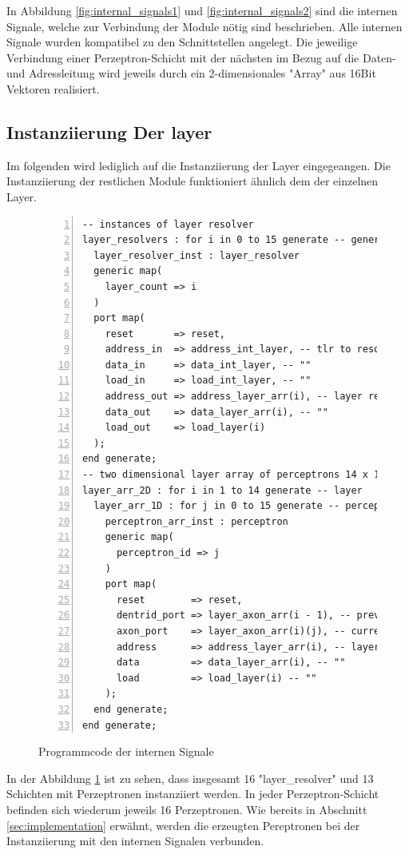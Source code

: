 \documentclass{article}
\numberwithin{equation}{section}
\begin{document}
\FloatBarrier
In Abbildung \ref{fig:internal_signals1} und \ref{fig:internal_signals2} sind die
internen Signale, welche zur Verbindung der Module nötig sind beschrieben.
Alle internen Signale wurden kompatibel zu den Schnittstellen angelegt.
Die jeweilige Verbindung einer Perzeptron-Schicht mit der nächsten im Bezug auf 
die Daten- und Adressleitung wird jeweils durch ein 2-dimensionales "Array" aus 
16Bit Vektoren realisiert.
\pagebreak
\subsection{Instanziierung Der layer}
Im folgenden wird lediglich auf die Instanziierung der Layer eingegeangen. 
Die Instanziierung der restlichen Module funktioniert ähnlich dem der einzelnen Layer.
\begin{figure}[htbp]
\begin{lstlisting}[style=VHDL,numbers=left,stepnumber=1,style=myCustomMatlabStyle,basicstyle=\footnotesize]
-- instances of layer resolver
layer_resolvers : for i in 0 to 15 generate -- generate 16 layer resolvers
  layer_resolver_inst : layer_resolver
  generic map(
    layer_count => i
  )
  port map(
    reset       => reset,
    address_in  => address_int_layer, -- tlr to resolvers
    data_in     => data_int_layer, -- ""
    load_in     => load_int_layer, -- ""
    address_out => address_layer_arr(i), -- layer resolver to perceptron array
    data_out    => data_layer_arr(i), -- ""
    load_out    => load_layer(i)
  );
end generate;
-- two dimensional layer array of perceptrons 14 x 16 (layer x perceptron)
layer_arr_2D : for i in 1 to 14 generate -- layer
  layer_arr_1D : for j in 0 to 15 generate -- perceptron in layer
    perceptron_arr_inst : perceptron
    generic map(
      perceptron_id => j
    )
    port map(
      reset        => reset,
      dentrid_port => layer_axon_arr(i - 1), -- prev layer to current layer
      axon_port    => layer_axon_arr(i)(j), -- current to next layer
      address      => address_layer_arr(i), -- layer resolver to perceptron array
      data         => data_layer_arr(i), -- ""
      load         => load_layer(i) -- ""
    );
  end generate;
end generate;
\end{lstlisting}
\caption{Programmcode der internen Signale} \label{code:generate_layers}
\end{figure}
In der Abbildung \ref{code:generate_layers} ist zu sehen, dass insgesamt 16 
"layer\_resolver" und 13 Schichten mit Perzeptronen instanziiert werden. In jeder 
Perzeptron-Schicht befinden sich wiederum jeweils 16 Perzeptronen. Wie bereits in 
Abschnitt \ref{sec:implementation} erwähnt, werden die erzeugten Pereptronen
bei der Instanziierung mit den internen Signalen verbunden.
\pagebreak
\end{document}
